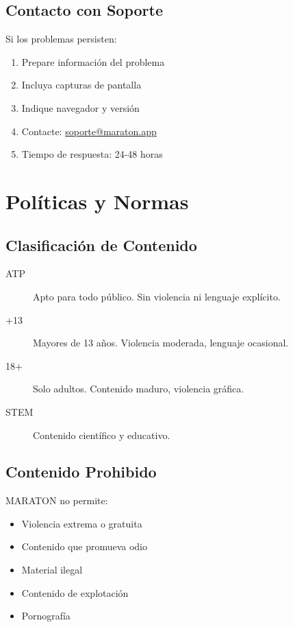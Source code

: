 \documentclass[11pt,a4paper,twoside]{book}
\begin{document}
\section{Contacto con Soporte}

Si los problemas persisten:

\begin{enumerate}
    \item Prepare información del problema
    \item Incluya capturas de pantalla
    \item Indique navegador y versión
    \item Contacte: \href{mailto:soporte@maraton.app}{soporte@maraton.app}
    \item Tiempo de respuesta: 24-48 horas
\end{enumerate}

\chapter{Políticas y Normas}

\section{Clasificación de Contenido}

\begin{description}
    \item[ATP] Apto para todo público. Sin violencia ni lenguaje explícito.
    \item[+13] Mayores de 13 años. Violencia moderada, lenguaje ocasional.
    \item[18+] Solo adultos. Contenido maduro, violencia gráfica.
    \item[STEM] Contenido científico y educativo.
\end{description}

\section{Contenido Prohibido}

MARATON no permite:
\begin{itemize}
    \item Violencia extrema o gratuita
    \item Contenido que promueva odio
    \item Material ilegal
    \item Contenido de explotación
    \item Pornografía
\end{itemize}
\end{document}
